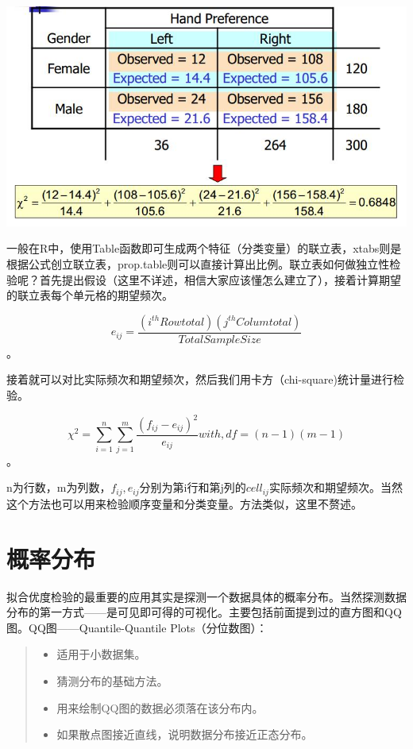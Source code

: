 \documentclass[]{ctexbook}
\providecommand{\tightlist}{%
  \setlength{\itemsep}{0pt}\setlength{\parskip}{0pt}}
\begin{document}
\includegraphics[width=1\linewidth,height=0.35\textheight]{fig/fig20}

一般在R中，使用Table函数即可生成两个特征（分类变量）的联立表，xtabs则是根据公式创立联立表，prop.table则可以直接计算出比例。联立表如何做独立性检验呢？首先提出假设（这里不详述，相信大家应该懂怎么建立了），接着计算期望的联立表每个单元格的期望频次。

\[e_{ij}=\frac{(i^{th} Rowtotal)(j^{th} Columtotal)}{Total SampleSize}\]。

接着就可以对比实际频次和期望频次，然后我们用卡方（chi-square)统计量进行检验。

\[\chi^2=\sum_{i=1}^n\sum_{j=1}^m\frac{(f_{ij}-e_{ij})^2}{e_{ij}} with, df=(n-1)(m-1)\]。

n为行数，m为列数，\(f_{ij},e_{ij}\)分别为第i行和第j列的\(cell_{ij}\)实际频次和期望频次。当然这个方法也可以用来检验顺序变量和分类变量。方法类似，这里不赘述。

\hypertarget{ux6982ux7387ux5206ux5e03}{%
\section{概率分布}\label{ux6982ux7387ux5206ux5e03}}

拟合优度检验的最重要的应用其实是探测一个数据具体的概率分布。当然探测数据分布的第一方式------是可见即可得的可视化。主要包括前面提到过的直方图和QQ图。QQ图------Quantile-Quantile Plots（分位数图）：

\begin{quote}
\begin{itemize}
\tightlist
\item
  适用于小数据集。
\item
  猜测分布的基础方法。
\item
  用来绘制QQ图的数据必须落在该分布内。
\item
  如果散点图接近直线，说明数据分布接近正态分布。
\end{itemize}
\end{quote}
\end{document}
